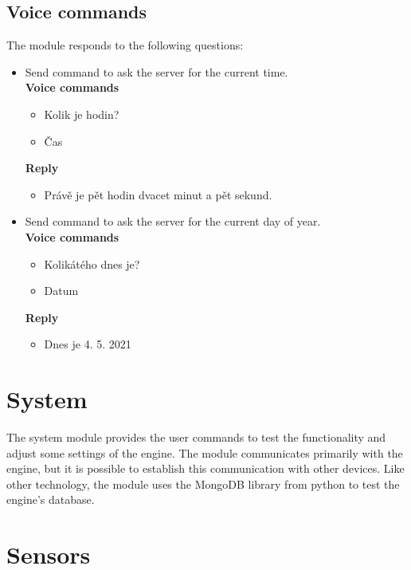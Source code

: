 
\subsection{Voice commands}
The module responds to the following questions:
\begin{itemize}
    \item Send command to ask the server for the current time.\\
    \textbf{Voice commands}
    \begin{itemize}
        \item Kolik je hodin?
        \item Čas
    \end{itemize}
    \textbf{Reply}
    \begin{itemize}
        \item Právě je pět hodin dvacet minut a pět sekund.
    \end{itemize}
    \item Send command to ask the server for the current day of year.\\
    \textbf{Voice commands}
    \begin{itemize}
        \item Kolikátého dnes je?
        \item Datum
    \end{itemize}
    \textbf{Reply}
    \begin{itemize}
        \item Dnes je 4. 5. 2021
    \end{itemize}
\end{itemize}

\section{System}

The system module provides the user commands to test the functionality and adjust some settings of the engine. The module communicates primarily with the engine, but it is possible to establish this communication with other devices. Like other technology, the module uses the MongoDB library from python to test the engine's database.

\section{Sensors}

